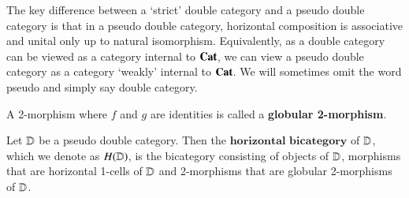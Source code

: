 \documentclass[reqno]{amsart}
\begin{document}
The key difference between a `strict' double category and a pseudo double category is that in a pseudo double category, horizontal composition is associative and unital only up to natural isomorphism. Equivalently, as a double category can be viewed as a category internal to $\mathbf{Cat}$, we can view a pseudo double category as a category `weakly' internal to $\mathbf{Cat}$. We will sometimes omit the word pseudo and simply say double category.

\begin{defn}
A 2-morphism where $f$ and $g$ are identities is called a \textbf{globular 2-morphism}.
\end{defn}

\begin{defn}
Let $\mathbf{\mathbb D}$ be a pseudo double category. Then the $\textbf{horizontal bicategory}$ of $\mathbf{\mathbb D}$, which we denote as $H(\mathbf{\mathbb D})$, is the bicategory consisting of objects of $\mathbf{\mathbb D}$, morphisms that are horizontal 1-cells of $\mathbf{\mathbb D}$ and 2-morphisms that are globular 2-morphisms of $\mathbf{\mathbb D}$.
\end{defn}
\end{document}
